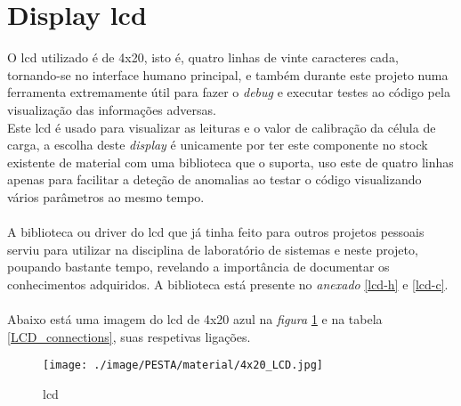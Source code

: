 \section{Display \acs{lcd}}
O \ac{lcd} utilizado é de 4x20, isto é, quatro linhas de vinte caracteres cada, tornando-se no interface humano principal, e também durante este projeto numa ferramenta extremamente útil para fazer o \textit{debug} e executar testes ao código pela visualização das informações adversas.\\
Este \acs{lcd} é usado para visualizar as leituras e o valor de calibração da célula de carga, a escolha deste \textit{display} é unicamente por ter este componente no stock existente de material com uma biblioteca que o suporta, uso este de quatro linhas apenas para facilitar a deteção de anomalias ao testar o código visualizando vários parâmetros ao mesmo tempo.
\\
\\
A biblioteca ou driver do \acs{lcd} que já tinha feito para outros projetos pessoais serviu para utilizar na disciplina de laboratório de sistemas e neste projeto, poupando bastante tempo, revelando a importância de documentar os conhecimentos adquiridos. A biblioteca está presente no \textit{anexado} \ref{lcd-h} e \ref{lcd-c}.
\\
\\
Abaixo está uma imagem do \acs{lcd} de 4x20 azul na \textit{figura} \ref{4x20_LCD} e na tabela \ref{LCD_connections}, suas respetivas ligações.
\\
\begin{figure}[H]
	\centering
	\texttt{[image: ./image/PESTA/material/4x20\_LCD.jpg]}
	\caption{\acs{lcd}}
	\label{4x20_LCD}
\end{figure}

